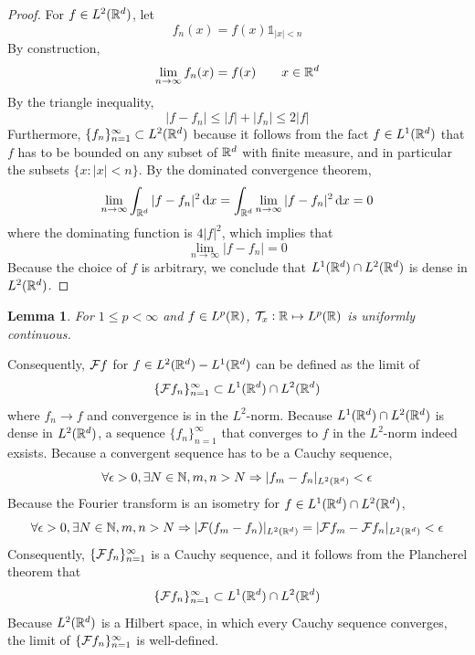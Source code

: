 \documentclass{article}
\newcommand{\ind}{{\mathds 1}}
\newtheorem{lemma}{Lemma}
\begin{document}
\begin{proof}
For $f \in L^2 ({\mathbb R}^d)$, let
\[
f_n (x) = f(x) \ind_{|x| < n}
\]
By construction,
\[
\lim_{n \rightarrow \infty} f_n (x) = f(x) \qquad x \in {\mathbb R}^d
\]
By the triangle inequality,
\[
|f - f_n|
\leq |f| + |f_n|
\leq 2 |f|
\]
Furthermore, $\{f_n\}_{n = 1}^\infty \subset L^2 ({\mathbb R}^d)$ because it follows from the fact $f \in L^1 ({\mathbb R}^d)$ that $f$ has to be bounded on any subset of ${\mathbb R}^d$ with finite measure, and in particular the subsets $\{x : |x| < n\}$.
By the dominated convergence theorem,
\[
\lim_{n \rightarrow \infty} \int_{\bbr^d} |f - f_n|^2 \dif x
= \int_{\bbr^d} \lim_{n \rightarrow \infty} |f - f_n|^2 \dif x
= 0
\]
where the dominating function is $4|f|^2$, which implies that
\[
\lim_{n \rightarrow \infty} |f - f_n| = 0
\]
Because the choice of $f$ is arbitrary, we conclude that $L^1 ({\mathbb R}^d) \cap L^2 ({\mathbb R}^d)$ is dense in $L^2 ({\mathbb R}^d)$.
\end{proof}

\begin{lemma}
For $1 \leq p < \infty$ and $f \in L^p ({\mathbb R})$, ${\mathcal T}_x: {\mathbb R} \mapsto L^p ({\mathbb R})$ is uniformly continuous.
\end{lemma}

% 

Consequently, ${\mathcal F} f$ for $f \in L^2 ({\mathbb R}^d) - L^1 ({\mathbb R}^d)$ can be defined as the limit of
\[
\{{\mathcal F} f_n\}_{n = 1}^\infty \subset L^1 ({\mathbb R}^d) \cap L^2 ({\mathbb R}^d)
\]
where $f_n \rightarrow f$ and convergence is in the $L^2$-norm.
Because $L^1 ({\mathbb R}^d) \cap L^2 ({\mathbb R}^d)$ is dense in $L^2 ({\mathbb R}^d)$, a sequence $\{f_n\}_{n = 1}^\infty$ that converges to $f$ in the $L^2$-norm indeed exsists.
Because a convergent sequence has to be a Cauchy sequence,
\[
\forall \epsilon > 0, \exists N \in {\mathbb N}, m, n > N \Rightarrow |f_m - f_n|_{L^2 ({\mathbb R}^d)} < \epsilon
\]
Because the Fourier transform is an isometry for $f \in L^1 ({\mathbb R}^d) \cap L^2 ({\mathbb R}^d)$,
\[
\forall \epsilon > 0, \exists N \in {\mathbb N}, m, n > N \Rightarrow |{\mathcal F} (f_m - f_n)|_{L^2 ({\mathbb R}^d)} = |{\mathcal F} f_m - {\mathcal F} f_n|_{L^2 ({\mathbb R}^d)} < \epsilon
\]
Consequently, $\{{\mathcal F} f_n\}_{n = 1}^\infty$ is a Cauchy sequence, and it follows from the Plancherel theorem that
\[
\{{\mathcal F} f_n\}_{n = 1}^\infty \subset L^1 ({\mathbb R}^d) \cap L^2 ({\mathbb R}^d)
\]
Because $L^2 ({\mathbb R}^d)$ is a Hilbert space, in which every Cauchy sequence converges, the limit of $\{{\mathcal F} f_n\}_{n = 1}^\infty$ is well-defined.
\end{document}
